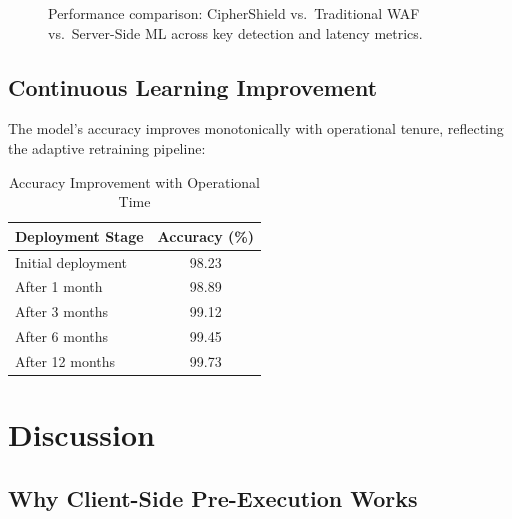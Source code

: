 \documentclass[10pt, twocolumn]{article}
\begin{document}
\begin{figure}[H]
  \centering
  \caption{Performance comparison: CipherShield vs.\ Traditional WAF vs.\ 
           Server-Side ML across key detection and latency metrics.}
  \label{fig:results}
\end{figure}

\subsection{Continuous Learning Improvement}

The model's accuracy improves monotonically with operational tenure, 
reflecting the adaptive retraining pipeline:

\begin{table}[H]
\centering
\caption{Accuracy Improvement with Operational Time}
\label{tab:learning}
\small
\begin{tabular}{lc}
\toprule
\textbf{Deployment Stage} & \textbf{Accuracy (\%)} \\
\midrule
Initial deployment  & 98.23 \\
After 1 month       & 98.89 \\
After 3 months      & 99.12 \\
After 6 months      & 99.45 \\
After 12 months     & 99.73 \\
\bottomrule
\end{tabular}
\end{table}

\section{Discussion}

\subsection{Why Client-Side Pre-Execution Works}
\end{document}
